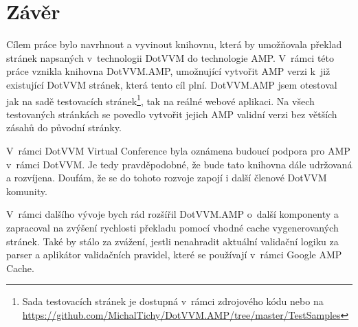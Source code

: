 \chapter{Závěr}
Cílem práce bylo navrhnout a vyvinout knihovnu, která by umožňovala překlad stránek napsaných v~technologii DotVVM do technologie AMP. V~rámci této práce vznikla knihovna DotVVM.AMP, umožnující vytvořit AMP verzi k~již existující DotVVM stránek, která tento cíl plní. DotVVM.AMP jsem otestoval jak na sadě testovacích stránek\footnote{ Sada testovacích stránek je dostupná v~rámci zdrojového kódu nebo na \url{https://github.com/MichalTichy/DotVVM.AMP/tree/master/TestSamples}}, tak na reálné webové aplikaci. Na všech testovaných stránkách se povedlo vytvořit jejich AMP validní verzi bez větších zásahů do původní stránky.

V~rámci DotVVM Virtual Conference byla oznámena budoucí podpora pro AMP v~rámci DotVVM. Je tedy pravděpodobné, že bude tato knihovna dále udržovaná a rozvíjena\cite{herceg_2020}.  Doufám, že se do tohoto rozvoje zapojí i další členové DotVVM komunity.

V~rámci dalšího vývoje bych rád rozšířil DotVVM.AMP o~další komponenty a zapracoval na zvýšení rychlosti překladu pomocí vhodné cache vygenerovaných stránek. Také by stálo za zvážení, jestli nenahradit aktuální validační logiku za parser a aplikátor validačních pravidel, které se používají v~rámci Google AMP Cache.